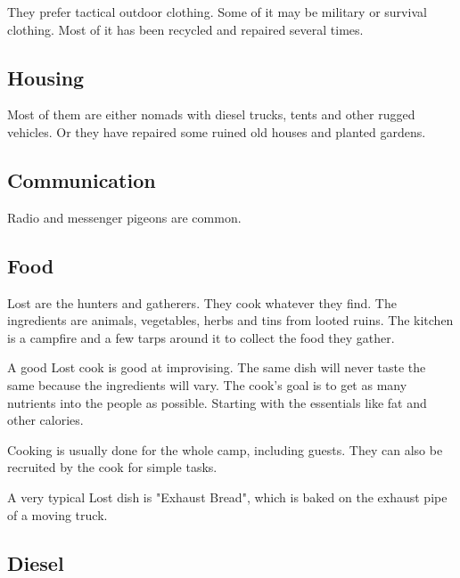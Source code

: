 They prefer tactical outdoor clothing. Some of it may be military or survival clothing. Most of it has been recycled and repaired several times.

\subsection{Housing}

Most of them are either nomads with diesel trucks, tents and other rugged vehicles. Or they have repaired some ruined old houses and planted gardens.

\subsection{Communication}

Radio and messenger pigeons are common.

\subsection{Food}
\label{sec:Lost food}

Lost are the hunters and gatherers. They cook whatever they find. The ingredients are animals, vegetables, herbs and tins from looted ruins. The kitchen is a campfire and a few tarps around it to collect the food they gather.

A good Lost cook is good at improvising. The same dish will never taste the same because the ingredients will vary. The cook's goal is to get as many nutrients into the people as possible. Starting with the essentials like fat and other calories.

Cooking is usually done for the whole camp, including guests. They can also be recruited by the cook for simple tasks.

A very typical Lost dish is "Exhaust Bread", which is baked on the exhaust pipe of a moving truck.


\subsection{Diesel}

